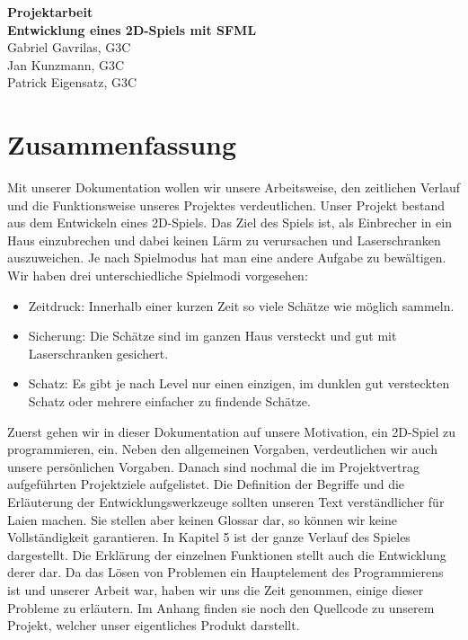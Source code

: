 \documentclass[11pt,a4paper]{scrbook}
\begin{document}
\begin{titlepage}
\begin{center}

\vspace*{3cm}
\textbf{\huge{Projektarbeit}}\\
\vspace*{2cm}
\textbf{\large{Entwicklung eines 2D-Spiels mit SFML}}\\
\vspace*{5cm}
Gabriel Gavrilas, G3C\\
Jan Kunzmann, G3C\\
Patrick Eigensatz, G3C
\end{center}
\end{titlepage}


\clearpage
\thispagestyle{empty}


\section*{Zusammenfassung}
Mit unserer Dokumentation wollen wir unsere Arbeitsweise, den zeitlichen Verlauf und die Funktionsweise unseres Projektes verdeutlichen.
Unser Projekt bestand aus dem Entwickeln eines 2D-Spiels.
Das Ziel des Spiels ist, als Einbrecher in ein Haus einzubrechen und dabei keinen Lärm zu verursachen und Laserschranken auszuweichen. Je nach Spielmodus hat man eine andere Aufgabe zu bewältigen.
Wir haben drei unterschiedliche Spielmodi vorgesehen:
\begin{itemize}
\item Zeitdruck: Innerhalb einer kurzen Zeit so viele Schätze wie möglich sammeln.
\item Sicherung: Die Schätze sind im ganzen Haus versteckt und gut mit Laserschranken gesichert.
\item Schatz: Es gibt je nach Level nur einen einzigen, im dunklen gut versteckten Schatz oder mehrere einfacher zu findende Schätze.
\end{itemize}
Zuerst gehen wir in dieser Dokumentation auf unsere Motivation, ein 2D-Spiel zu programmieren, ein.
Neben den allgemeinen Vorgaben, verdeutlichen wir auch unsere persönlichen Vorgaben.
Danach sind nochmal die im Projektvertrag aufgeführten Projektziele aufgelistet.
Die Definition der Begriffe und die Erläuterung der Entwicklungswerkzeuge sollten unseren Text verständlicher für Laien machen.
Sie stellen aber keinen Glossar dar, so können wir keine Vollständigkeit garantieren.
In Kapitel 5 ist der ganze Verlauf des Spieles dargestellt.
Die Erklärung der einzelnen Funktionen stellt auch die Entwicklung derer dar.
Da das Lösen von Problemen ein Hauptelement des Programmierens ist und unserer Arbeit war, haben wir uns die Zeit genommen, einige dieser Probleme zu erläutern.
Im Anhang finden sie noch den Quellcode zu unserem Projekt, welcher unser eigentliches Produkt darstellt.
\end{document}
